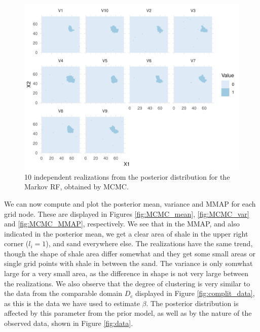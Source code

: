 \begin{figure}
    \centering
    \includegraphics[scale=0.95]{figures/realizations_MCMC.pdf}
    \caption{10 independent realizations from the posterior distribution for the Markov RF, obtained by MCMC.}
    \label{fig:MCMC_realiz}
\end{figure}

We can now compute and plot the posterior mean, variance and MMAP for each grid node. These are displayed in Figures \ref{fig:MCMC_mean}, \ref{fig:MCMC_var} and \ref{fig:MCMC_MMAP}, respectively. We see that in the MMAP, and also indicated in the posterior mean, we get a clear area of shale in the upper right corner ($l_i = 1$), and sand everywhere else. The realizations have the same trend, though the shape of shale area differ somewhat and they get some small areas or single grid points with shale in between the sand. The variance is only somwhat large for a very small area, as the difference in shape is not very large between the realizations. We also observe that the degree of clustering is very similar to the data from the comparable domain $D_c$ displayed in Figure \ref{fig:complit_data}, as this is the data we have used to estimate $\beta$. The posterior distribution is affected by this parameter from the prior model, as well as by the nature of the observed data, shown in Figure \ref{fig:data}.

